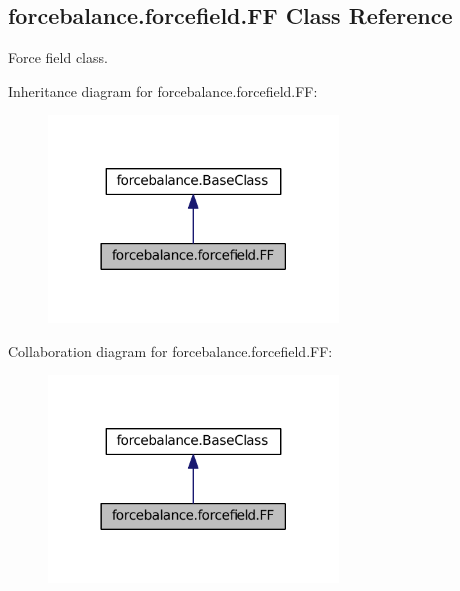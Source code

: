 \hypertarget{classforcebalance_1_1forcefield_1_1FF}{\subsection{forcebalance.\-forcefield.\-F\-F \-Class \-Reference}
\label{classforcebalance_1_1forcefield_1_1FF}
}


\-Force field class.  




\-Inheritance diagram for forcebalance.\-forcefield.\-F\-F\-:
\nopagebreak
\begin{figure}[H]
\begin{center}
\leavevmode
\includegraphics[width=218pt]{classforcebalance_1_1forcefield_1_1FF__inherit__graph}
\end{center}
\end{figure}


\-Collaboration diagram for forcebalance.\-forcefield.\-F\-F\-:
\nopagebreak
\begin{figure}[H]
\begin{center}
\leavevmode
\includegraphics[width=218pt]{classforcebalance_1_1forcefield_1_1FF__coll__graph}
\end{center}
\end{figure}
